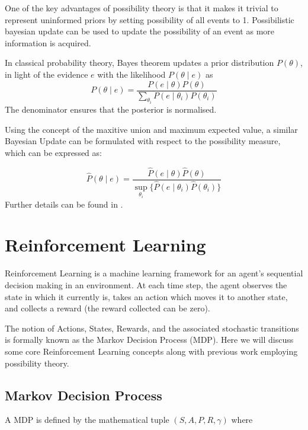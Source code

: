 \documentclass[11pt,a4paper]{report}
\begin{document}
One of the key advantages of possibility theory is that it makes it trivial to represent uninformed priors by setting possibility of all events to 1. Possibilistic bayesian update can be used to update the possibility of an event as more information is acquired.  \par

In classical probability theory, Bayes theorem updates a prior distribution $P(\theta)$, in light of the evidence $e$ with the likelihood $P(\theta \mid e)$ as 
\[
  P(\theta \mid e) = \frac{P(e\mid \theta)P(\theta)}{\sum_{\theta_i}{P(e \mid \theta_i)P(\theta_i)}} 
\]
The denominator ensures that the posterior is normalised. \par  

Using the concept of the maxitive union and maximum expected value, a similar Bayesian Update can be formulated with respect to the possibility measure, which can be expressed as: 

\[
  \hat{P}(\theta \mid e) = \frac{\hat{P}(e\mid \theta)\hat{P}(\theta)}{\sup_{\theta_i}\{\hat{P}(e \mid \theta_i)\hat{P}(\theta_i)\}} 
\]
Further details can be found in \cite{Dubois2013}. 

\section{Reinforcement Learning}

Reinforcement Learning is a machine learning framework for an agent's sequential decision making in an environment. At each time step, the agent observes the state in which it currently is, takes an action which moves it to another state, and collects a reward (the reward collected can be zero). \par

The notion of Actions, States, Rewards, and the associated stochastic transitions is formally known as the Markov Decision Process (MDP). Here we will discuss some core Reinforcement Learning concepts along with previous work employing possibility theory. \par

\subsection{Markov Decision Process}

A MDP is defined by the mathematical tuple $(S, A, P, R, \gamma)$ where \par
\end{document}
